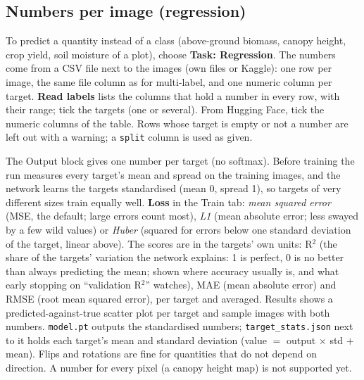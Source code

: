 \documentclass[11pt,a4paper]{article}
\newcommand{\ui}[1]{\textbf{\textsf{#1}}}
\newcommand{\file}[1]{\texttt{#1}}
\begin{document}
\subsection{Numbers per image (regression)}
\label{sec:regression}
To predict a quantity instead of a class (above-ground biomass, canopy height, crop yield, soil moisture of a plot), choose \ui{Task:
Regression}. The numbers come from a CSV file next to the images (own files or Kaggle): one row per image, the same file column as for
multi-label, and one numeric column per target. \ui{Read labels} lists the columns that hold a number in every row, with their range;
tick the targets (one or several). From Hugging Face, tick the numeric columns of the table. Rows whose target is empty or not a number
are left out with a warning; a \texttt{split} column is used as given.

The Output block gives one number per target (no softmax). Before training the run measures every target's mean and spread on the
training images, and the network learns the targets standardised (mean 0, spread 1), so targets of very different sizes train equally
well. \ui{Loss} in the Train tab: \emph{mean squared error} (MSE, the default; large errors count most), \emph{L1} (mean absolute error;
less swayed by a few wild values) or \emph{Huber} (squared for errors below one standard deviation of the target, linear above). The
scores are in the targets' own units: R$^2$ (the share of the targets' variation the network explains: 1 is perfect, 0 is no better than
always predicting the mean; shown where accuracy usually is, and what early stopping on ``validation R$^2$'' watches), MAE (mean absolute
error) and RMSE (root mean squared error), per target and averaged. Results shows a predicted-against-true scatter plot per target and
sample images with both numbers. \file{model.pt} outputs the standardised numbers; \file{target\_stats.json} next to it holds each
target's mean and standard deviation (value $=$ output $\times$ std $+$ mean). Flips and rotations are fine for quantities that do not
depend on direction. A number for every pixel (a canopy height map) is not supported yet.
\end{document}
